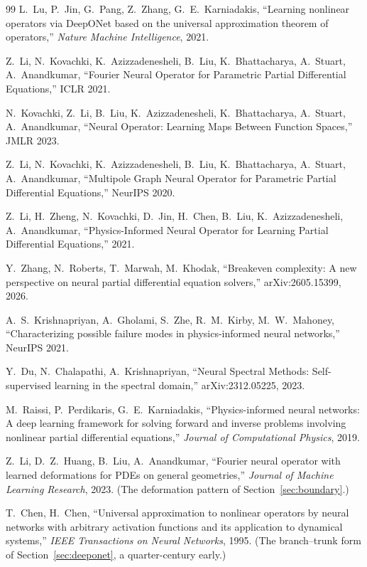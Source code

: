 \documentclass[10pt,a4paper]{article}
\begin{document}
\begin{thebibliography}{99}\small
{}
L.~Lu, P.~Jin, G.~Pang, Z.~Zhang, G.~E.~Karniadakis,
``Learning nonlinear operators via DeepONet based on the universal
approximation theorem of operators,'' \emph{Nature Machine Intelligence},
2021.

Z.~Li, N.~Kovachki, K.~Azizzadenesheli, B.~Liu, K.~Bhattacharya,
A.~Stuart, A.~Anandkumar, ``Fourier Neural Operator for Parametric Partial
Differential Equations,'' ICLR 2021.

N.~Kovachki, Z.~Li, B.~Liu, K.~Azizzadenesheli, K.~Bhattacharya,
A.~Stuart, A.~Anandkumar, ``Neural Operator: Learning Maps Between Function
Spaces,'' JMLR 2023.

Z.~Li, N.~Kovachki, K.~Azizzadenesheli, B.~Liu, K.~Bhattacharya,
A.~Stuart, A.~Anandkumar, ``Multipole Graph Neural Operator for Parametric
Partial Differential Equations,'' NeurIPS 2020.

Z.~Li, H.~Zheng, N.~Kovachki, D.~Jin, H.~Chen, B.~Liu,
K.~Azizzadenesheli, A.~Anandkumar, ``Physics-Informed Neural Operator for
Learning Partial Differential Equations,'' 2021.

Y.~Zhang, N.~Roberts, T.~Marwah, M.~Khodak, ``Breakeven complexity: A new
perspective on neural partial differential equation solvers,'' arXiv:2605.15399,
2026.

A.~S.~Krishnapriyan, A.~Gholami, S.~Zhe, R.~M.~Kirby, M.~W.~Mahoney,
``Characterizing possible failure modes in physics-informed neural networks,''
NeurIPS 2021.

Y.~Du, N.~Chalapathi, A.~Krishnapriyan, ``Neural Spectral Methods:
Self-supervised learning in the spectral domain,'' arXiv:2312.05225, 2023.

M.~Raissi, P.~Perdikaris, G.~E.~Karniadakis, ``Physics-informed neural
networks: A deep learning framework for solving forward and inverse problems
involving nonlinear partial differential equations,'' \emph{Journal of
Computational Physics}, 2019.

Z.~Li, D.~Z.~Huang, B.~Liu, A.~Anandkumar, ``Fourier neural operator
with learned deformations for PDEs on general geometries,''
\emph{Journal of Machine Learning Research}, 2023. (The deformation
pattern of Section~\ref{sec:boundary}.)

T.~Chen, H.~Chen, ``Universal approximation to nonlinear operators by
neural networks with arbitrary activation functions and its application to
dynamical systems,'' \emph{IEEE Transactions on Neural Networks}, 1995.
(The branch--trunk form of Section~\ref{sec:deeponet}, a quarter-century
early.)


\end{thebibliography}
\end{document}
